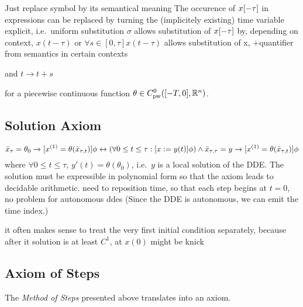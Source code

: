 \documentclass[10pt]{report}
\begin{document}
        Just replace symbol by its semantical meaning
        The occurence of $x[-\tau]$ in expressions can be replaced by turning the (implicitely existing) time variable explicit, i.e.\
        uniform substitution $\sigma$
        allows substitution of $x[-\tau]$ by, depending on context, $x(t-\tau)$ or $\forall{s\in[0,\tau]}{x(t-\tau)}$
        allows substitution of x, +quantifier from semantics in certain contexts

        \begin{calculus}
        \end{calculus}
        and $t\rightarrow t+s$

        for a piecewise continuous function $\theta\in\statespace$.

    \subsection{Solution Axiom}
        \label{sec:solution-axiom}
        \begin{equation}
            \xbartau = \theta_0 \rightarrow [\D{x}=\theta(\xbartaut{t})]\phi
            \leftrightarrow
            \left(\forall 0\leq t\leq\tau: [x:= y(t)]\phi \right)
            \wedge \xbartaut{\tau} = y \rightarrow [\D{x}=\theta (\xbartaut{t})]\phi
        \end{equation}
        where $\forall 0\leq t\leq\tau$, $y'(t)=\theta(\theta_0)$, i.e.\ $y$ is a local solution of the DDE. The solution must be expressible in polynomial form so that the axiom leads to decidable arithmetic.
        need to reposition time, so that each step begins at $t=0$, no problem for autonomous ddes
        (Since the DDE is autonomous, we can emit the time index.)

it often makes sense to treat the very first initial condition separately, because after it solution is at least $C^1$, at $x(0)$ might be knick

    \subsection{Axiom of Steps}
        \label{sec:axiom-of-steps}

        The \emph{Method of Steps} presented above translates into an axiom.
\end{document}

